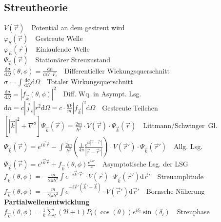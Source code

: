 \documentclass[8pt,a4paper]{extarticle}
\newcommand{\frml}[2]{$#1$~\hfill~#2\\}
\newcommand{\tder}[2]{\frac{\mathrm d #1}{\mathrm d #2}}
\begin{document}
\begin{multicols}{3}
\subsection{Streutheorie}
\frml{V(\vec{r})}{Potential an dem gestreut wird}
\frml{\varphi_{S}(\vec{r})}{Gestreute Welle}
\frml{\varphi_{E}(\vec{r})}{Einlaufende Welle}
\frml{\Psi_{\vec{k}}(\vec{r})}{Station\"arer Streuzustand}
\frml{\tder{\sigma}{\Omega}(\theta , \phi) = \tder{n}{\Omega \cdot F_i}}{Differentieller Wiekungsquerschnitt}
\frml{\sigma = \int \tder{\sigma}{\Omega} \mathrm{d}\Omega}{Totaler Wirkungsquerschnitt}
\frml{\tder{\sigma}{\Omega} = \left|f_{\vec{k}}(\theta, \phi)\right|^2}{Diff. Wq. in Asympt. Lsg.}
\frml{\mathrm{d}n = c\left|\vec{j}_s\right|r^2\mathrm{d}\Omega = c\cdot \frac{\hbar k}{m}\left|f_{\vec{k}}\right|^2\mathrm{d}\Omega}{Gestreute Teilchen}
\frml{\left[ \left| \vec{k} \right|^2 + \nabla^2\right] \Psi_{\vec{k}}(\vec{r}) = \frac{2m}{\hbar^2}\cdot V(\vec{r}) \cdot \Psi_{\vec{k}}(\vec{r})}{Littmann/Schwinger~Gl.}
\frml{\Psi_{\vec{k}}(\vec{r}) = e^{i\vec{k}\vec{r}}-\int \frac{2m}{\hbar^2}\left(\frac{1}{4\pi}\frac{e^{ik\left|\vec{r}-\vec{r}'\right|}}{\left|\vec{r}-\vec{r}'\right|}\right)\cdot V(\vec{r}')\cdot\Psi_{\vec{k}}(\vec{r}')}{Allg. Lsg.}
\frml{\Psi_{\vec{k}}(\vec{r}) = e^{i\vec{k}\vec{r}} + f_{\vec{k}}(\theta, \phi)\frac{e^{ikr}}{r}}{Asymptotische Lsg. der LSG}
\frml{f_{\vec{k}}(\theta, \phi) = -\frac{m}{2\pi\hbar^2}\int e^{-i\vec{k}'\vec{r}'}\cdot V(\vec{r})\cdot \Psi_{\vec{k}}(\vec{r}')\mathrm{d}\vec{r}'}{Streuamplitude}
\frml{f_{\vec{k}}(\theta, \phi) = -\frac{m}{2\pi\hbar^2}\int e^{-i\vec{r}'(\vec{k}'-\vec{k})}\cdot V(\vec{r}')\mathrm{d}\vec{r}'}{Bornsche N\"aherung}
\textbf{Partialwellenentwicklung} \\
\frml{f_{\vec{k}}(\theta, \phi) = \frac{1}{k}\sum_l (2l+1)P_l(\cos(\theta))e^{i\delta_l}\sin(\delta_l)}{Streuphase}

\end{multicols}
\end{document}
